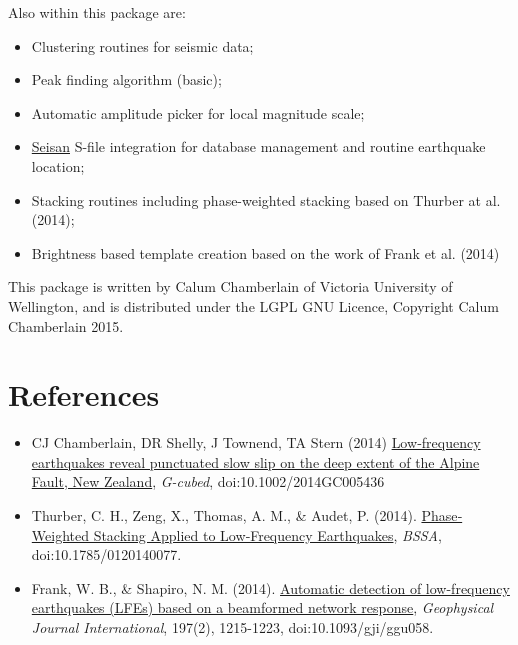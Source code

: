 \documentclass[a4paper,10pt,english]{sphinxmanual}
\begin{document}
Also within this package are:
\begin{itemize}
\item {} 
Clustering routines for seismic data;

\item {} 
Peak finding algorithm (basic);

\item {} 
Automatic amplitude picker for local magnitude scale;

\item {} 
\href{http://seisan.info/}{Seisan} S-file integration for database management and routine earthquake location;

\item {} 
Stacking routines including phase-weighted stacking based on Thurber at al. (2014);

\item {} 
Brightness based template creation based on the work of Frank et al. (2014)

\end{itemize}

This package is written by Calum Chamberlain of Victoria University of Wellington, and
is distributed under the LGPL GNU Licence, Copyright Calum Chamberlain 2015.


\chapter{References}
\label{index:references}\begin{itemize}
\item {} 
CJ Chamberlain, DR Shelly, J Townend, TA Stern (2014) \href{http://onlinelibrary.wiley.com/doi/10.1002/2014GC005436/full}{Low‐frequency earthquakes reveal punctuated slow slip on the deep extent of the Alpine Fault, New Zealand}, \emph{G-cubed}, doi:10.1002/2014GC005436

\item {} 
Thurber, C. H., Zeng, X., Thomas, A. M., \& Audet, P. (2014). \href{http://www.bssaonline.org/content/early/2014/08/12/0120140077.abstract}{Phase‐Weighted Stacking Applied to Low‐Frequency Earthquakes}, \emph{BSSA}, doi:10.1785/0120140077.

\item {} 
Frank, W. B., \& Shapiro, N. M. (2014). \href{http://gji.oxfordjournals.org/content/197/2/1215.short}{Automatic detection of low-frequency earthquakes (LFEs) based on a beamformed network response}, \emph{Geophysical Journal International}, 197(2), 1215-1223, doi:10.1093/gji/ggu058.

\end{itemize}
\end{document}
